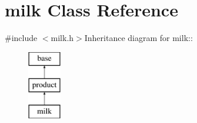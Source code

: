 \hypertarget{classmilk}{
\section{milk Class Reference}
\label{classmilk}
}


{\ttfamily \#include $<$milk.h$>$}Inheritance diagram for milk::\begin{figure}[H]
\begin{center}
\leavevmode
\includegraphics[height=3cm]{classmilk}
\end{center}
\end{figure}
